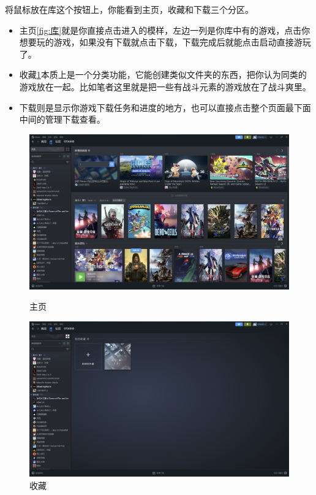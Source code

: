\documentclass{article}
\begin{document}
        将鼠标放在库这个按钮上，你能看到主页，收藏和下载三个分区。
        \begin{itemize}
            \item 主页\ref{fig:库}就是你直接点击进入的模样，左边一列是你库中有的游戏，点击你想要玩的游戏，如果没有下载就点击下载，下载完成后就能点击启动直接游玩了。
            \item 收藏\ref{fig:收藏}本质上是一个分类功能，它能创建类似文件夹的东西，把你认为同类的游戏放在一起。比如笔者这里就是把一些有战斗元素的游戏放在了战斗爽里。
            \item 下载则是显示你游戏下载任务和进度的地方，也可以直接点击整个页面最下面中间的管理下载查看。
        \end{itemize}
        
        \begin{figure}[H]
            \centering
            \begin{minipage}{0.48\textwidth}
                \centering
                \includegraphics[width=\linewidth]{图/库.png}
                \caption{主页}
                \label{fig:库}
            \end{minipage}
            \hfill
            \begin{minipage}{0.48\textwidth}
                \centering
                \includegraphics[width=\linewidth]{图/收藏.png}
                \caption{收藏}
                \label{fig:收藏}
            \end{minipage}
        \end{figure}
    
\end{document}
